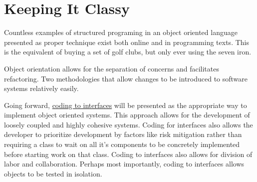 
\chapter{Keeping It Classy}

Countless examples of structured programing in an object oriented language presented as proper technique exist both online and in programming texts. This is the equivalent of buying a set of golf clubs, but only ever using the seven iron.

Object orientation allows for the separation of concerns and facilitates refactoring. Two methodologies that allow changes to be introduced to software systems relatively easily.

Going forward, \href{http://www.javaworld.com/javaworld/jw-08-1999/jw-08-interfaces.html}{coding to interfaces} will be presented as the appropriate way to implement object oriented systems. This approach allows for the development of loosely coupled and highly cohesive systems. Coding for interfaces also allows the developer to prioritize development by factors like risk mitigation rather than requiring a class to wait on all it's components to be concretely implemented before starting work on that class. Coding to interfaces also allows for division of labor and collaboration. Perhaps most importantly, coding to interfaces allows objects to be tested in isolation.

